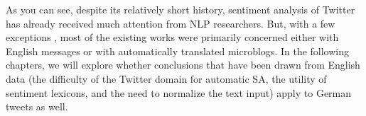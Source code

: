 As you can see, despite its relatively short history, sentiment
analysis of Twitter has already received much attention from NLP
researchers.  But, with a few exceptions
\cite[\eg{}][]{Basile:13,Bosco:13,Araque:15,Cesteros:15}, most of the
existing works were primarily concerned either with English messages
or with automatically translated microblogs.  In the following
chapters, we will explore whether conclusions that have been drawn
from English data (the difficulty of the Twitter domain for automatic
SA, the utility of sentiment lexicons, and the need to normalize the
text input) apply to German tweets as well.






